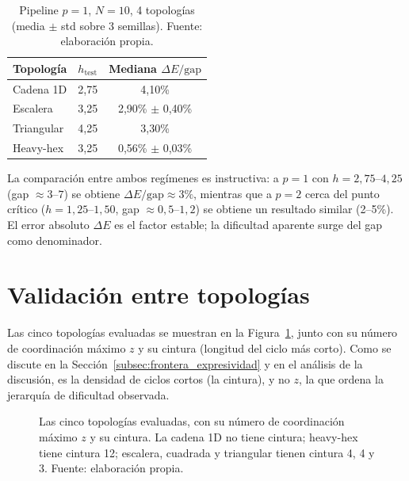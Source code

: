 \documentclass[11pt,a4paper,spanish]{book}
\begin{document}
\begin{table}[H]
\centering
\caption[Pipeline a $p = 1$, $N = 10$ en cuatro topologías]{Pipeline $p = 1$, $N = 10$, 4 topologías (media $\pm$ std sobre 3 semillas). Fuente: elaboración propia.\protect\footnotemark}
\label{tab:results_p1}
\begin{tabular}{lcc}
\toprule
\textbf{Topología} & \textbf{$h_{\text{test}}$} & \textbf{Mediana $\Delta E/\text{gap}$} \\
\midrule
Cadena 1D & 2,75 & 4,10\% \\
Escalera & 3,25 & 2,90\% $\pm$ 0,40\% \\
Triangular & 4,25 & 3,30\% \\
Heavy-hex & 3,25 & 0,56\% $\pm$ 0,03\% \\
\bottomrule
\end{tabular}
\end{table}

La comparación entre ambos regímenes es instructiva: a $p = 1$ con $h = 2,75$--$4,25$ (gap $\approx 3$--$7$) se obtiene $\Delta E/\text{gap} \approx 3\%$, mientras que a $p = 2$ cerca del punto crítico ($h = 1,25$--$1,50$, gap $\approx 0,5$--$1,2$) se obtiene un resultado similar (2--5\%). El error absoluto $\Delta E$ es el factor estable; la dificultad aparente surge del gap como denominador.

\section{Validación entre topologías}

Las cinco topologías evaluadas se muestran en la Figura~\ref{fig:topologias}, junto con su número de coordinación máximo $z$ y su cintura (longitud del ciclo más corto). Como se discute en la Sección~\ref{subsec:frontera_expresividad} y en el análisis de la discusión, es la densidad de ciclos cortos (la cintura), y no $z$, la que ordena la jerarquía de dificultad observada.

\begin{figure}[H]
\centering
\bgroup\shorthandoff{<>}
\resizebox{\textwidth}{!}{}
\egroup
\caption[Las cinco topologías de red evaluadas]{Las cinco topologías evaluadas, con su número de coordinación máximo $z$ y su cintura. La cadena 1D no tiene cintura; heavy-hex tiene cintura 12; escalera, cuadrada y triangular tienen cintura 4, 4 y 3. Fuente: elaboración propia.}
\label{fig:topologias}
\end{figure}
\end{document}
